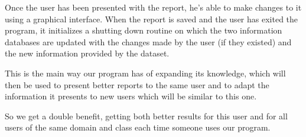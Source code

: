 Once the user has been presented with the report, he's able to make changes to it using a graphical interface. When the report is saved and the user has exited the program, it initializes a shutting down routine on which the two information databases are updated with the changes made by the user (if they existed) and the new information provided by the dataset.

This is the main way our program has of expanding its knowledge, which will then be used to present better reports to the same user and to adapt the information it presents to new users which will be similar to this one.

So we get a double benefit, getting both better results for this user and for all users of the same domain and class each time someone uses our program.



